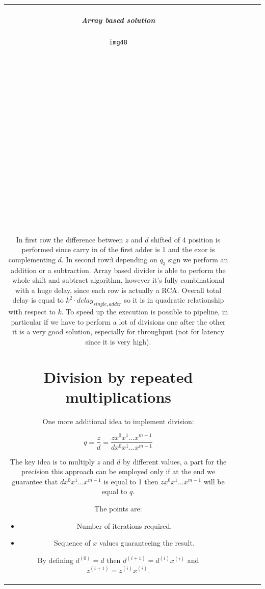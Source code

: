 \begin{center}
\begin{tabular}{|c|c|c|c|c|}
\subparagraph{Array based solution}

\begin{verbatim}
img48



















\end{verbatim}

In first row the difference between $z$ and $d$ shifted of 4 position is performed since carry in of the first adder is 1 and the exor is complementing $d$. In second row:ì depending on $q_3$ sign we perform an addition or a subtraction.
Array based divider is able to perform the whole shift and subtract algorithm, however it's fully combinational with a huge delay, since each row is actually a RCA. Overall total delay is equal to $k^2 \cdot delay_{single,adder}$ so it is in quadratic relationship with respect to $k$. To speed up the execution is possible to pipeline, in particular if we have to perform a lot of divisions one after the other it is a very good solution, especially for throughput (not for latency since it is very high).

\section{Division by repeated multiplications}

One more additional idea to implement division:

$$q=\frac{z}{d}=\frac{z x^{0} x^{1}... x^{m-1}}{d x^{0} x^{1}... x^{m-1}}$$

The key idea is to multiply $z$ and $d$ by different values, a part for the precision this approach can be employed only if at the end we guarantee that $d x^{0} x^{1}... x^{m-1}$ is equal to 1 then $z x^{0} x^{1}... x^{m-1}$ will be equal to $q$.

The points are:
\begin{itemize}
  \item Number of iterations required.
  \item Sequence of $x$ values guaranteeing the result.
\end{itemize}

By defining $d^{(0)}=d$ then $d^{(i+1)}=d^{(i)}x^{(i)}$ and $z^{(i+1)}=z^{(i)}x^{(i)}$.


\end{tabular}
\end{center}
